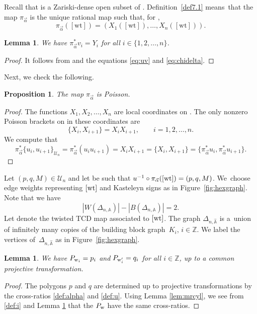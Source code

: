 \documentclass[pdftex]{sigma}
\numberwithin{equation}{section}
\newtheorem{Lemma}[Theorem]{Lemma}
\newtheorem{Proposition}[Theorem]{Proposition}
 { \theoremstyle{definition}
\newtheorem{Definition}[Theorem]{Definition}
\newtheorem{Note}[Theorem]{Note}
\newtheorem{Example}[Theorem]{Example}
\newtheorem{Remark}[Theorem]{Remark} }
\newcommand{\Z}{{\mathbb Z}}
\newcommand{\CP}{{\mathbb C\mathrm P}}
\newcommand{\A}{{\mathbb A}}
\newcommand{\ra}{\rightarrow}
\newcommand{\la}{\label}
\newcommand{\w}{{\rm w}}
\newcommand{\wt}{{\rm wt}}
\begin{document}
Recall that  is a Zariski-dense open subset of . Definition~\ref{def7.1} means~that the map $\pi_{\vec \alpha}$ is the unique rational map such that, for ,
	\[
	\pi_{\vec \alpha}([\mathrm{wt}])=(X_1([\mathrm{wt}]),\dots,X_n([\mathrm{wt}])).
	\]
	
	\begin{Lemma}\la{lem:vzzdelta}
		We have $\pi_{\vec \alpha}^*v_i = Y_i$ 	for all $i \in \{1,2,\dots,n\}$.
	\end{Lemma}
	\begin{proof}
		It follows from  and the equations \eqref{eq:uv} and \eqref{eq:chidelta}.
	\end{proof}

	Next, we check the following.

	\begin{Proposition}\label{p:Poisson}
		The map $\pi_{\vec \alpha}$ is Poisson.
	\end{Proposition}
	\begin{proof}
		The functions $X_1,X_2,\dots,X_{n}$ are local coordinates on . The only nonzero Poisson brackets on  in these coordinates are
		\[
		\{X_i,X_{i+1}\}=X_i X_{i+1},\qquad i=1,2,\dots,n.
		\]
		We compute that
		\[
		{\pi_{\vec \alpha}^*\{u_i,u_{i+1}\}_{\mathcal U_n}=\pi_{\vec \alpha}^*(u_iu_{i+1})=X_i X_{i+1}=\{X_i,X_{i+1}\}=\bigl\{\pi_{\vec \alpha}^*u_i,\pi_{\vec \alpha}^*u_{i+1}\bigr\}.}
\tag*{\qed}
  \]
\renewcommand{\qed}{}
\end{proof}

	Let $(p,q,M)\in\mathcal U_n$ and let \smash{$[\wt] \in \mathcal X_{N_{\Delta_n},\vec \alpha}^\lambda$} be such that $u^{-1} \circ \pi_{\vec \alpha}([\wt])=(p,q,M)$. We~choose edge weights representing $[\wt]$ and Kasteleyn signs as in Figure~\ref{fig:hexgraph}.
	Note that we have
\[
|W(\Delta_{n,\A})|-|B(\Delta_{n,\A})|=2.
\]
 Let \smash{$P\colon W(\Delta_{n,\widehat \A}) \ra \CP^1$} denote the twisted TCD map associated to $[\wt]$. The graph $\Delta_{n,\widehat \A}$ is a~union of infinitely many copies of the building block graph~$K_i$, $i \in \Z$. We label the vertices of~$\Delta_{n,\widehat \A}$ as in Figure~\ref{fig:hexgraph}.
	
	\begin{Lemma}%
		We have $P_{\w_i}=p_i$ and $P_{\w'_i}=q_i$ for all $i \in \Z$, up to a {common} projective transformation.
	\end{Lemma}
	\begin{proof}
		The polygons $p$ and $q$ are determined up to projective transformations by the cross-ratios \eqref{def:alpha} and \eqref{def:u}. Using Lemma \ref{lem:mrcyl}, we see from \eqref{def:i} and Lemma \ref{lem:vzzdelta} that the $P_\w$ have the same cross-ratios.
	\end{proof}
\end{document}
